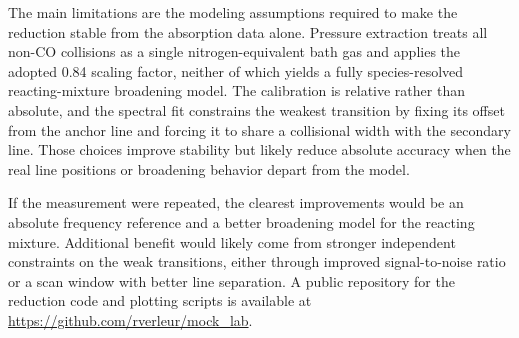 \documentclass[12pt,letterpaper]{article}
\begin{document}
The main limitations are the modeling assumptions required to make the reduction stable from the absorption data alone. Pressure extraction treats all non-CO collisions as a single nitrogen-equivalent bath gas and applies the adopted 0.84 scaling factor, neither of which yields a fully species-resolved reacting-mixture broadening model. The calibration is relative rather than absolute, and the spectral fit constrains the weakest transition by fixing its offset from the anchor line and forcing it to share a collisional width with the secondary line. Those choices improve stability but likely reduce absolute accuracy when the real line positions or broadening behavior depart from the model.

If the measurement were repeated, the clearest improvements would be an absolute frequency reference and a better broadening model for the reacting mixture. Additional benefit would likely come from stronger independent constraints on the weak transitions, either through improved signal-to-noise ratio or a scan window with better line separation. A public repository for the reduction code and plotting scripts is available at \url{https://github.com/rverleur/mock_lab}.



\end{document}
